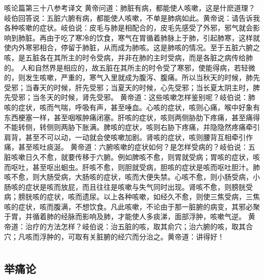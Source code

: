 \documentclass[a4paper,12pt,UTF8,twoside]{ctexbook}
\begin{document}
咳论篇第三十八参考译文
黄帝问道：肺脏有病，都能使人咳嗽，这是什麽道理？岐伯回答说：五脏六腑有病，都能使人咳嗽，不单是肺病如此。黄帝说：请告诉我各种咳嗽的症状。岐伯说：皮毛与肺是相配合的，皮毛先感受了外邪，邪气就会影响到肺脏。再由于吃了寒冷的饮食，寒气在胃循着肺脉上于肺，引起肺寒，这样就使内外寒邪相合，停留于肺脏，从而成为肺咳。这是肺咳的情况。至于五脏六腑之咳，是五脏各在其所主的时令受病，并非在肺的主时受病，而是各脏之病传给肺的。
人和自然界是相应的，故五脏在其所主的时令受了寒邪，使能得病，若轻微的，则发生咳嗽，严重的，寒气入里就成为腹泻、腹痛。所以当秋天的时候，肺先受邪；当春天的时候，肝先受邪；当夏天的时候，心先受邪；当长夏太阴主时，脾先受邪；当冬天的时候，肾先受邪。
黄帝道：这些咳嗽怎样鉴别呢？岐伯说：肺咳的症状，咳而气喘，呼吸有声，甚至唾血。心咳的症状，咳则心痛，喉中好象有东西梗塞一样，甚至咽喉肿痛闭塞。肝咳的症状，咳则两侧胁肋下疼痛，甚至痛得不能转侧，转侧则两胁下胀满。脾咳的症状，咳则右胁下疼痛，并隐隐然疼痛牵引肩背，甚至不可以动，一动就会使咳嗽加剧。肾咳的症状，咳则腰背互相牵引作痛，甚至咳吐痰涎。
黄帝道：六腑咳嗽的症状如何？是怎样受病的？岐伯说：五脏咳嗽日久不愈，就要传移于六腑。例如脾咳不愈，则胃就受病；胃咳的症状，咳而呕吐，甚至呕出蛔虫。肝咳不愈，则胆就受病，胆咳的症状是咳而呕吐胆汁。肺咳不愈，则大肠受病，大肠咳的症状，咳而大便失禁。心咳不愈，则小肠受病，小肠咳的症状是咳而放屁，而且往往是咳嗽与失气同时出现。肾咳不愈，则膀胱受病；膀胱咳的症状，咳而遗尿。以上各种咳嗽，如经久不愈，则使三焦受病，三焦咳的症状，咳而腹满，不想饮食。凡此咳嗽，不论由于那一脏腑的病变，其邪必聚于胃，并循着肺的经脉而影响及肺，才能使人多痰涕，面部浮肿，咳嗽气逆。
黄帝道：治疗的方法怎样？岐伯说：治五脏的咳，取其俞穴；治六腑的咳，取其合穴；凡咳而浮肿的，可取有关脏腑的经穴而分治之。黄帝道：讲得好！

\part{}

\chapter{举痛论}
\end{document}
